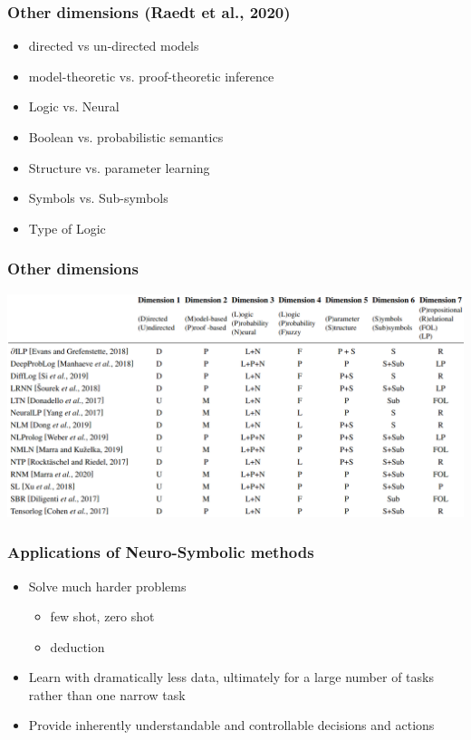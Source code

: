 \documentclass{beamer}
\begin{document}
\begin{frame}
  \frametitle{Other dimensions (Raedt et al., 2020)}
  \begin{itemize}
  \item directed vs un-directed models
  \item model-theoretic vs. proof-theoretic inference
  \item Logic vs. Neural
  \item Boolean vs. probabilistic semantics
  \item Structure vs. parameter learning
  \item Symbols vs. Sub-symbols
  \item Type of Logic
  \end{itemize}
\end{frame}

\begin{frame}
  \frametitle{Other dimensions}
  \centering
  \includegraphics[width=1\textwidth]{im3.png}
\end{frame}

\begin{frame}
  \frametitle{Applications of Neuro-Symbolic methods}
  \begin{itemize}
  \item Solve much harder problems
    \begin{itemize}
    \item few shot, zero shot
    \item deduction
    \end{itemize}
  \item Learn with dramatically less data, ultimately for a large
    number of tasks rather than one narrow task
  \item Provide inherently understandable and controllable decisions
    and actions
  \end{itemize}
\end{frame}
\end{document}
